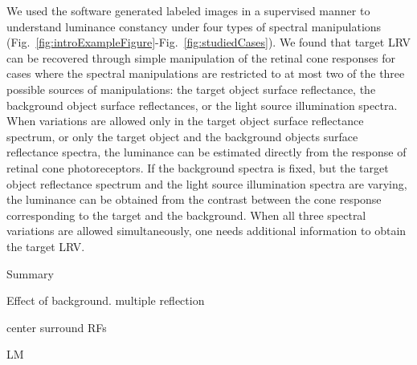 \documentclass{jov}
\begin{document}
We used the software generated labeled images in a supervised manner to understand luminance constancy under four types of spectral manipulations (Fig.~\ref{fig:introExampleFigure}-Fig.~\ref{fig:studiedCases}). We found that target LRV can be recovered through simple manipulation of the retinal cone responses for cases where the spectral manipulations are restricted to at most two of the three possible sources of manipulations: the target object surface reflectance, the background object surface reflectances, or the light source illumination spectra. When variations are allowed only in the target object surface reflectance spectrum, or only the target object and the background objects surface reflectance spectra, the luminance can be estimated directly from the response of retinal cone photoreceptors. If the background spectra is fixed, but the target object reflectance spectrum and the light source illumination spectra are varying, the luminance can be obtained from the contrast between the cone response corresponding to the target and the background. When all three spectral variations are allowed simultaneously, one needs additional information to obtain the target LRV. 


Summary

Effect of background. multiple reflection

center surround RFs

LM

\end{document}
